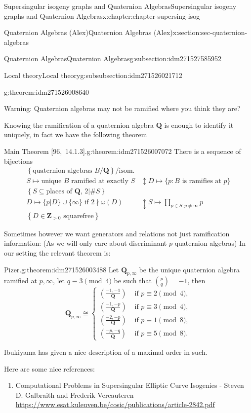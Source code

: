 \documentclass[oneside,10pt,]{book}
\numberwithin{equation}{section}
\newcommand{\legendre}[2]{\left(\frac{#1}{#2}\right)}
\newcommand{\ZZ}{\mathbf{Z}}
\newcommand{\QQ}{\mathbf{Q}}
\newcommand{\gt}{>}
\newcommand{\amp}{&}
\begin{document}
\begin{chapterptx}{Supersingular isogeny graphs and Quaternion Algebras}{}{Supersingular isogeny graphs and Quaternion Algebras}{}{}{x:chapter:chapter-supersing-isog}
\begin{sectionptx}{Quaternion Algebras (Alex)}{}{Quaternion Algebras (Alex)}{}{}{x:section:sec-quaternion-algebras}
\begin{subsectionptx}{Quaternion Algebras}{}{Quaternion Algebras}{}{}{g:subsection:idm271527585952}
\begin{subsubsectionptx}{Local theory}{}{Local theory}{}{}{g:subsubsection:idm271526021712}
\begin{theorem}{}{}{g:theorem:idm271526008640}
\end{theorem}
Warning: Quaternion algebras may not be ramified where you think they are?%
\par
Knowing the ramification of a quaternion algebra \(\QQ\) is enough to identify it uniquely, in fact we have the following theorem%
\begin{theorem}{Main Theorem [96,~14.1.3].}{}{g:theorem:idm271526007072}%
There is a sequence of bijections%
\begin{align*}
\left\{ \text{quaternion algebras }B/\QQ \right\}/\text{isom.}\\
S \mapsto \text{unique }B \text{ ramified at exactly }S\amp\updownarrow D\mapsto \{p : B \text{ is ramifies at } p\}\\
\left\{ S \subseteq \text{places of }\QQ,\,2|\#S \right\}\\
D \mapsto \{p|D\} \cup \{\infty\} \text{ if }2\nmid \omega(D)\amp\updownarrow S \mapsto \prod_{p\in S,p\ne \infty} p\\
\left\{ D\in \ZZ_{\gt 0 }\text{ squarefree}\right\}
\end{align*}
%
\end{theorem}
Sometimes however we want generators and relations not just ramification information: (As we will only care about discriminant \(p\) quaternion algebras) In our setting the relevant theorem is:%
\begin{theorem}{Pizer.}{}{g:theorem:idm271526003488}%
Let \(\QQ_{p,\infty}\) be the unique quaternion algebra ramified at \(p,\infty\), let \(q \equiv 3 \pmod 4\) be such that \(\legendre pq = -1\), then%
\begin{equation*}
\QQ_{p,\infty} \cong
\begin{cases}
\legendre{-1,-1}{\QQ} \amp \text{ if }p\equiv 2\pmod 4,\\
\legendre{-1,-p}{\QQ} \amp \text{ if }p\equiv 3\pmod 4,\\
\legendre{-2,-p}{\QQ} \amp \text{ if }p\equiv 1\pmod 8,\\
\legendre{-p,-q}{\QQ} \amp \text{ if }p\equiv 5\pmod 8.
\end{cases}
\end{equation*}
%
\end{theorem}
Ibukiyama has given a nice description of a maximal order in such.%
\par
Here are some nice references:%
\begin{enumerate}
\item{}Computational Problems in Supersingular Elliptic Curve Isogenies - Steven D. Galbraith and Frederik Vercauteren \url{https://www.esat.kuleuven.be/cosic/publications/article-2842.pdf}%

\end{enumerate}
\end{subsubsectionptx}
\end{subsectionptx}
\end{sectionptx}
\end{chapterptx}
\end{document}
